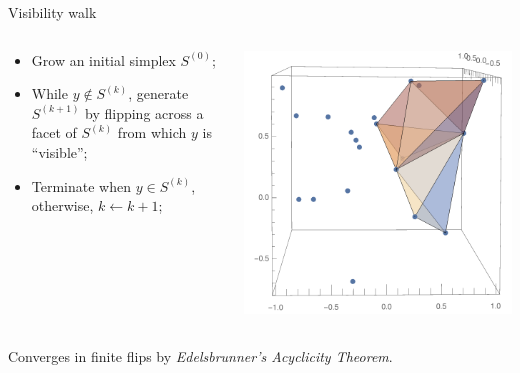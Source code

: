 \documentclass[aspectratio=169]{beamer}
\begin{document}
\begin{frame}{Visibility walk}
\begin{columns}
\begin{column}{.48\textwidth}
\begin{itemize}
\item Grow an initial simplex $S^{(0)}$;
\item While $y \not\in S^{(k)}$, generate $S^{(k+1)}$ by flipping
across a facet of $S^{(k)}$ from which $y$ is ``visible'';
\item Terminate when $y\in S^{(k)}$, otherwise, $k \leftarrow k+1$;
\end{itemize}
\end{column}
\begin{column}{.48\textwidth}
\includegraphics[width=\textwidth]{../img/delaunay_old/DelaunayWalk.pdf}
\end{column}
\end{columns}
\medskip
Converges in finite flips by {\it Edelsbrunner's Acyclicity Theorem}.
\end{frame}
\end{document}
